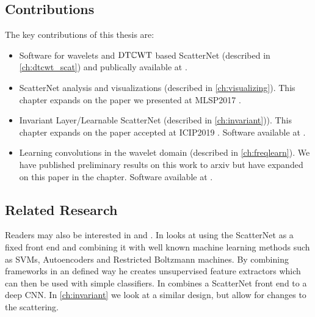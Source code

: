 \subsection{Contributions}
The key contributions of this thesis are:

\begin{itemize}
  \item Software for wavelets and $\mathrm{DT}\mathbb{C}\mathrm{WT}$ based ScatterNet (described in \autoref{ch:dtcwt_scat})
    and publically available at \cite{cotter_pytorch_2018}.
  \item ScatterNet analysis and visualizations (described in
    \autoref{ch:visualizing}). This chapter expands on the paper we presented at MLSP2017 
    \cite{cotter_visualizing_2017}.
  \item Invariant Layer/Learnable ScatterNet (described in \autoref{ch:invariant})). This chapter expands 
    on the paper accepted at ICIP2019 \cite{cotter_learnable_2019}. Software
    available at \cite{cotter_learnable_2019-1}.
  \item Learning convolutions in the wavelet domain (described in
    \autoref{ch:freqlearn}). We have published preliminary results on this work
    to arxiv \cite{cotter_deep_2018} but have expanded on this paper in the
    chapter. Software available at \cite{cotter_dtcwt_2018}.
\end{itemize}

\subsection{Related Research}
Readers may also be interested in \cite{singh_scatternet_2018} and
\cite{oyallon_analyzing_2017}. In \cite{singh_scatternet_2018}
\citeauthor{singh_scatternet_2018} looks at using the ScatterNet as a fixed
front end and combining it with well known machine learning methods such as
SVMs, Autoencoders and Restricted Boltzmann machines. By combining frameworks in
an defined way he creates unsupervised feature extractors which can then be used
with simple classifiers. In \cite{oyallon_analyzing_2017}
\citeauthor{oyallon_analyzing_2017} combines a ScatterNet front end to a deep
CNN. In \autoref{ch:invariant} we look at a similar design, but allow for changes to
the scattering.
